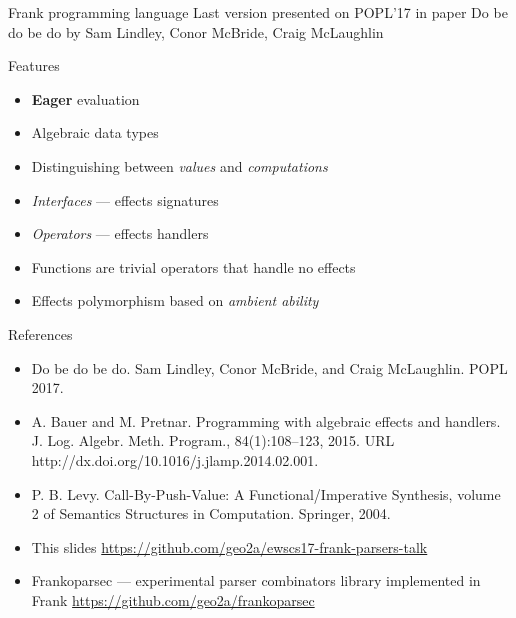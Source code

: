 

\begin{frame}{Frank programming language}
  Last version presented on POPL'17 in paper Do be do be do by Sam Lindley, Conor McBride, Craig McLaughlin
  \begin{block}{Features}
    \begin{itemize}
      \item \textbf{Eager} evaluation
      \item Algebraic data types
      \item Distinguishing between \emph{values} and \emph{computations}
      \item \emph{Interfaces} --- effects signatures
      \item \emph{Operators} --- effects handlers
      \item Functions are trivial operators that handle no effects
      \item Effects polymorphism based on \emph{ambient ability}
    \end{itemize}
  \end{block}
\end{frame}



\begin{frame}{References}

\begin{itemize}
  \item Do be do be do. Sam Lindley, Conor McBride, and Craig McLaughlin. POPL 2017.
  \item A. Bauer and M. Pretnar. Programming with algebraic effects and handlers. J. Log. Algebr. Meth. Program., 84(1):108–123, 2015. URL http://dx.doi.org/10.1016/j.jlamp.2014.02.001.
  \item P. B. Levy. Call-By-Push-Value: A Functional/Imperative Synthesis, volume 2 of Semantics Structures in Computation. Springer, 2004.
  \item This slides \url{https://github.com/geo2a/ewscs17-frank-parsers-talk}
  \item Frankoparsec --- experimental parser combinators library implemented in Frank \url{https://github.com/geo2a/frankoparsec}
\end{itemize}

\end{frame}


